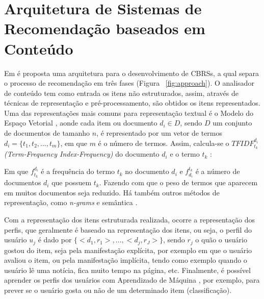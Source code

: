 \documentclass[normaltoc, espacoumemeio, pnumromarab,ruledheader]{abnt}
\begin{document}
\section{Arquitetura de Sistemas de Recomendação baseados em Conteúdo}
\label{sec:arquitetura}

Em \cite{Lops2011} é proposta uma arquitetura para o desenvolvimento de CBRSs, a qual separa o processo de recomendação em três fases (Figura ~\ref{fig:approach}). O analisador de conteúdo tem como entrada os itens não estruturados, assim, através de técnicas de representação e pré-processamento, são obtidos os itens representados. Uma das representações mais comuns \cite{Adomavicius2005,Lops2011,Jannach2011} para representação textual é o Modelo do Espaço Vetorial \cite{Salton1975}, aonde cada item ou documento $d_i \in D$, sendo $D$ um conjunto de documentos de tamanho $n$, é representado por um vetor de termos $d_i = \{t_1, t_2, \dots, t_m\}$, em que $m$ é o número de termos. Assim, calcula-se o \textit{$TFIDF^{d_i}_{t_k}$ (Term-Frequency Index-Frequency)} do documento $d_i$ e o termo $t_k$ \cite{Salton1975}:

Em que $f^{d_i}_{t_k}$ é a frequência do termo $t_k$ no documento $d_i$ e $f^{t_k}_{d_i}$ é a número de documentos $d_i$ que possuem $t_k$. Fazendo com que o peso de termos que aparecem em muitos documentos seja reduzido. Há também outros métodos de representação, como \textit{n-grams} e semântica \cite{Lops2011,Jannach2011}.


Com a representação dos itens estruturada realizada, ocorre a representação dos perfis, que geralmente é baseado na representação dos itens, ou seja, o perfil do usuário $u_j$ é dado por $\{<d_1, r_1>, \dots, <d_j, r_J>\}$, sendo $r_j$ o quão o usuário gostou do item, seja pela manifestação explícita, por exemplo em que o usuário avaliou o item, ou pela manifestação implícita, tendo como exemplo quando o usuário lê uma notícia, fica muito tempo na página, etc. Finalmente, é possível aprender os perfis dos usuários com Aprendizado de Máquina \cite{Adomavicius2005,Lops2011,Jannach2011}, por exemplo, para prever se o usuário gosta ou não de um determinado item (classificação).
\end{document}
